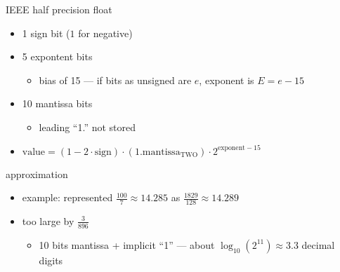\begin{frame}{IEEE half precision float}
\begin{itemize}
\item 1 sign bit ($1$ for negative)
\item 5 expontent bits
    \begin{itemize}
    \item bias of 15 --- if bits as unsigned are $e$, exponent is $E=e-15$
    \end{itemize}
\item 10 mantissa bits
    \begin{itemize}
    \item leading ``1.'' not stored
    \end{itemize}
\vspace{.5cm}
\item $\text{value} = (1-2\cdot \text{sign}) \cdot (1.\text{mantissa}_\text{TWO}) \cdot 2^{\text{exponent}-15}$
\end{itemize}
\end{frame}

\begin{frame}{approximation}
    \begin{itemize}
    \item example: represented $\frac{100}{7}\approx 14.285$ as $\frac{1829}{128}\approx14.289$
    \item too large by $\frac{3}{896}$
        \begin{itemize}
        \item 10 bits mantissa + implicit ``1'' --- about $\log_{10}(2^{11}) \approx 3.3$ decimal digits
        \end{itemize}
    \end{itemize}
\end{frame}
